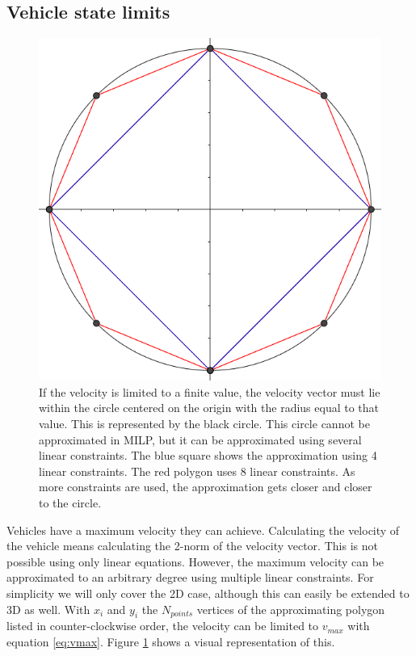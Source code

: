 \subsection{Vehicle state limits}
\begin{figure}
    \centering
        \includegraphics[width=0.6\columnwidth]{img/circlelinear}
    \caption{If the velocity is limited to a finite value, the velocity vector must lie within the circle centered on the origin with the radius equal to that value. This is represented by the black circle. This circle cannot be approximated in MILP, but it can be approximated using several linear constraints. The blue square shows the approximation using 4 linear constraints. The red polygon uses 8 linear constraints. As more constraints are used, the approximation gets closer and closer to the circle. }\label{fig:circlelinear}
\end{figure}
Vehicles have a maximum velocity they can achieve. Calculating the velocity of the vehicle means calculating the 2-norm of the velocity vector. This is not possible using only linear equations. However, the maximum velocity can be approximated to an arbitrary degree using multiple linear constraints. For simplicity we will only cover the 2D case, although this can easily be extended to 3D as well. With $x_i$ and $y_i$ the $N_{points}$ vertices of the approximating polygon listed in counter-clockwise order, the velocity can be limited to $v_{max}$ with equation \ref{eq:vmax}. Figure \ref{fig:circlelinear} shows a visual representation of this.
